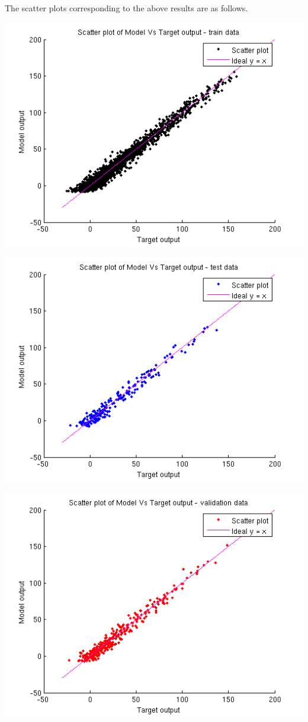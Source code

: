 \documentclass{article}
\begin{document}
The scatter plots corresponding to the above results are as follows.
\begin{center}
\includegraphics[scale=.6]{Regression/bivar/eps/scatter_train}
\end{center}
\begin{center}
\includegraphics[scale=.6]{Regression/bivar/eps/scatter_test}
\end{center}
\begin{center}
\includegraphics[scale=.6]{Regression/bivar/eps/scatter_val}
\end{center}
\newpage
\end{document}
